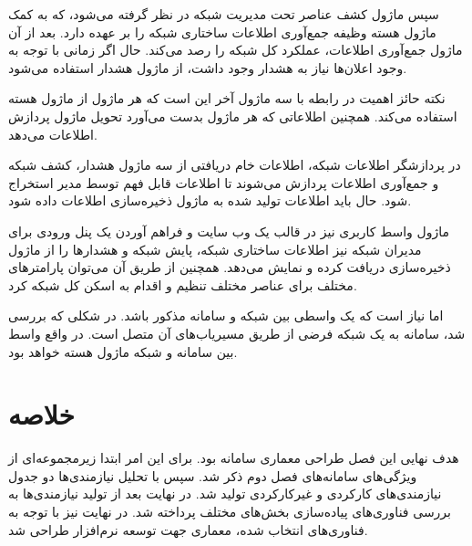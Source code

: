 سپس ماژول کشف عناصر تحت مدیریت شبکه در نظر گرفته می‌شود، که به کمک ماژول هسته وظیفه جمع‌آوری اطلاعات ساختاری شبکه را بر عهده دارد. بعد از آن ماژول جمع‌آوری اطلاعات، عملکرد کل شبکه را رصد می‌کند. حال اگر زمانی با توجه به وجود اعلان‌ها نیاز به هشدار وجود داشت، از ماژول هشدار استفاده می‌شود. 

\newpage

نکته حائز اهمیت در رابطه با سه ماژول آخر این است که هر ماژول از ماژول هسته استفاده می‌کند. همچنین اطلاعاتی که هر ماژول بدست می‌آورد تحویل ماژول پردازش اطلاعات می‌دهد.

در پردازشگر اطلاعات شبکه، اطلاعات خام دریافتی از سه ماژول هشدار، کشف شبکه و جمع‌آوری اطلاعات پردازش می‌شوند تا اطلاعات قابل فهم توسط مدیر استخراج شود. حال باید اطلاعات تولید شده به ماژول ذخیره‌سازی اطلاعات داده شود.

ماژول واسط کاربری نیز در قالب یک وب سایت و فراهم آوردن یک پنل ورودی برای مدیران شبکه نیز اطلاعات ساختاری شبکه، پایش شبکه و هشدارها را از ماژول ذخیره‌سازی دریافت کرده و نمایش می‌دهد. همچنین از طریق آن می‌توان پارامترهای مختلف برای عناصر مختلف تنظیم و اقدام به اسکن کل شبکه کرد.

اما نیاز است که یک واسطی بین شبکه و سامانه مذکور باشد. در شکلی که بررسی شد، سامانه به یک شبکه فرضی از طریق مسیریاب‌های آن متصل است. در واقع واسط بین سامانه و شبکه ماژول هسته  خواهد بود.






\section{خلاصه}


هدف نهایی این فصل طراحی معماری سامانه بود. برای این امر ابتدا زیرمجموعه‌ای از ویژگی‌های سامانه‌های فصل دوم ذکر شد.
سپس با تحلیل نیازمندی‌ها دو جدول نیازمندی‌های کارکردی و غیرکارکردی تولید شد. در نهایت بعد از تولید نیازمندی‌ها به بررسی فناوری‌های پیاده‌سازی بخش‌های مختلف پرداخته شد. در نهایت نیز با توجه به فناوری‌های انتخاب شده، معماری جهت توسعه نرم‌افزار طراحی شد.

